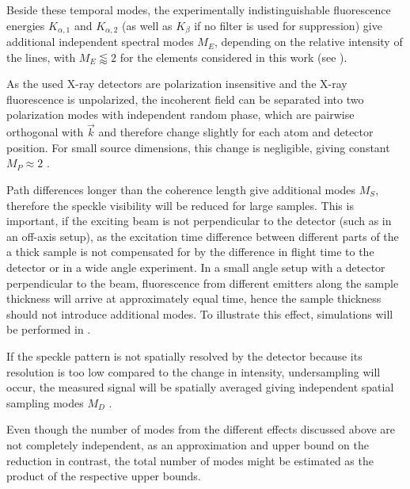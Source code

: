 Beside these temporal modes, the experimentally indistinguishable fluorescence energies $K_{\alpha,1}$ and $K_{\alpha,2}$ (as well as  $K_\beta$ if no filter is used for suppression) give additional independent spectral modes $M_E$, depending on the relative intensity of the lines, with $M_E \lessapprox 2$ for the elements considered in this work (see ).

As the used X-ray detectors are polarization insensitive and the X-ray fluorescence is unpolarized, the incoherent field can be separated into two polarization modes with independent random phase, which are pairwise orthogonal with $\vec{k}$ and therefore change slightly for each atom and detector position. For small source dimensions, this change is negligible,  giving constant $M_P \approx 2$ \cite{classen2019}. 

Path differences longer than the coherence length give additional modes $M_S$, therefore the speckle visibility will be reduced for large samples. This is important, if the exciting beam is not perpendicular to the detector (such as in an off-axis setup), as the excitation time difference between different parts of the a thick sample is not compensated for by the difference in flight time to the detector or in a wide angle experiment. In a small angle setup with a detector perpendicular to the beam, fluorescence from different emitters along the sample thickness will arrive at approximately equal time, hence the sample thickness should not introduce additional modes. To illustrate this effect, simulations will be performed in .

If the speckle pattern is not spatially resolved by the detector because its resolution is too low compared to the change in intensity, undersampling will occur, the measured signal will be spatially averaged giving independent spatial sampling modes $M_D$ \cite{goodman2007}.

Even though the number of modes from the different effects discussed above are not completely independent, as an approximation and upper bound on the reduction in contrast, the total number of modes might be estimated as the product of the respective upper bounds. 


